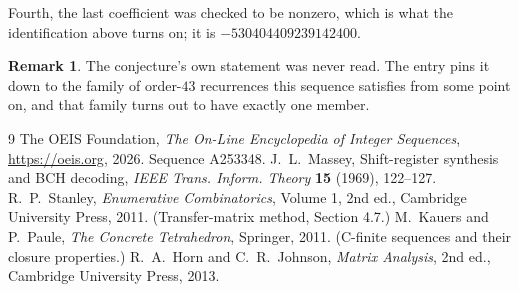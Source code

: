 \documentclass[11pt,a4paper]{article}
\theoremstyle{plain}
\theoremstyle{definition}
\newtheorem{remark}[theorem]{Remark}
\begin{document}
Fourth, the last coefficient was checked to be nonzero, which is what the identification above
turns on; it is $-530404409239142400$.

\begin{remark}
The conjecture's own statement was never read. The entry pins it down to the family of
order-$43$ recurrences this sequence satisfies from some point on, and that family turns
out to have exactly one member.
\end{remark}

\begin{thebibliography}{9}
 The OEIS Foundation, \emph{The On-Line Encyclopedia of Integer
Sequences}, \url{https://oeis.org}, 2026. Sequence A253348.
 J.~L.~Massey, Shift-register synthesis and BCH decoding, \emph{IEEE
Trans. Inform. Theory} \textbf{15} (1969), 122--127.
 R.~P.~Stanley, \emph{Enumerative Combinatorics}, Volume 1, 2nd ed.,
Cambridge University Press, 2011. (Transfer-matrix method, Section 4.7.)
 M.~Kauers and P.~Paule, \emph{The Concrete Tetrahedron}, Springer, 2011.
(C-finite sequences and their closure properties.)
 R.~A.~Horn and C.~R.~Johnson, \emph{Matrix Analysis}, 2nd ed., Cambridge
University Press, 2013.
\end{thebibliography}
\end{document}
